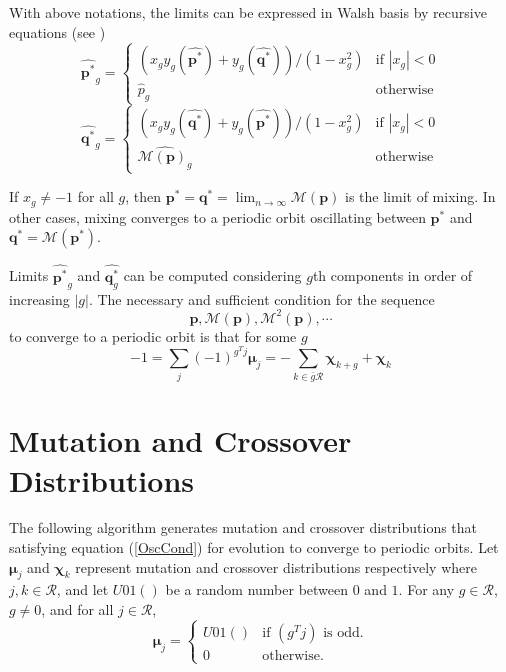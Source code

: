 With above notations, the limits can be expressed in Walsh basis by recursive equations (see \cite{Vose1999})
\begin{equation}
\label{lt1}
\widehat{{\bm p}^{\ast}}_g  = \begin{cases}
    (x_g y_g(\widehat{{\bm p}^{\ast}}) + y_g(\widehat{{\bm q}^{\ast}}))/(1-x_g^2)  & \text{if $|x_g| < 0$}\\
    \widehat{p}_g  & \text{otherwise}
  \end{cases}
\end{equation}
\begin{equation}
\label{lt2}
\widehat{{\bm q}^{\ast}}_g  = \begin{cases}
    (x_g y_g(\widehat{{\bm q}^{\ast}}) + y_g(\widehat{{\bm p}^{\ast}}))/(1-x_g^2)  & \text{if $|x_g| < 0$}\\
    \widehat{\mathcal{M}({\bm p})_g}  & \text{otherwise}
  \end{cases}
\end{equation}

If $x_g \neq -1$ for all $g$, then ${\bm p}^\ast = {\bm q}^\ast = \lim_{n \rightarrow \infty} \mathcal{M}({\bm p})$ is the limit of mixing. In other cases, 
mixing converges to a periodic orbit oscillating between ${\bm p}^\ast$ and ${\bm q}^\ast = \mathcal{M}({\bm p}^\ast)$.

Limits $\widehat{{\bm p}^{\ast}}_g$ and $\widehat{{\bm q}^{\ast}_g}$ can be computed considering $g$th components in order of increasing $|g|$.
The necessary and sufficient condition for the sequence
\[
\bm{p}, \mathcal{M}({\bm p}), \mathcal{M}^2({\bm p}),\cdots
\]
to converge to a periodic orbit is that for some $g$
\begin{equation}
\label{OscCond}
-1 = \sum \limits_{j} (-1)^{g^T j} \bm{\mu}_j = - \sum \limits_{k \in \bar{g}\mathcal{R}} \bm{\chi}_{k+g} + \bm{\chi}_k
\end{equation}
 
\section{Mutation and Crossover Distributions}
The following algorithm generates mutation and crossover distributions that satisfying equation (\ref{OscCond}) 
for evolution to converge to periodic orbits. 
Let $\bm{\mu}_j$ and $\bm{\chi}_k$ represent mutation and crossover distributions respectively where $j,k \in \mathcal{R}$, 
and let $U01()$ be a random number between $0$ and $1$. For any $g \in \mathcal{R}$, $g \neq 0$, and for all $j \in \mathcal{R}$,
\[
\bm{\mu}_j = \begin{cases}
    U01() & \text{if $(g^T j)$ is odd}.\\
    0 & \text{otherwise}.
  \end{cases}
\]

